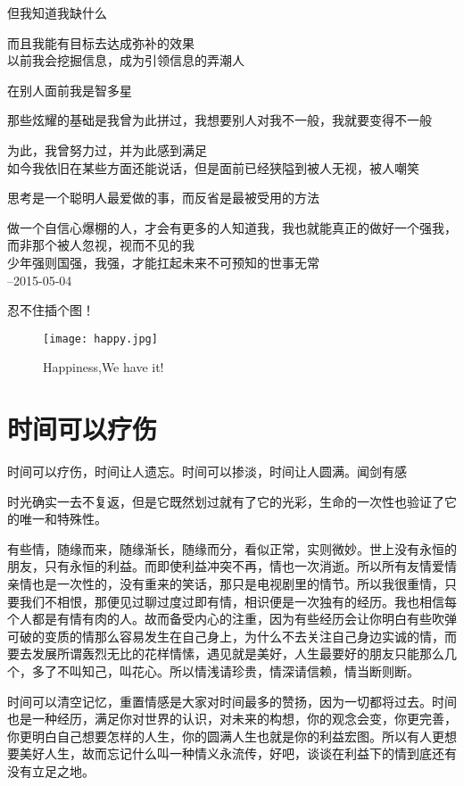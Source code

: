 \documentclass[color=green,mathpazo,titlestyle=hang]{elegantbook}
\begin{document}
但我知道我缺什么

而且我能有目标去达成弥补的效果~\\
 
以前我会挖掘信息，成为引领信息的弄潮人

在别人面前我是智多星

那些炫耀的基础是我曾为此拼过，我想要别人对我不一般，我就要变得不一般

为此，我曾努力过，并为此感到满足~\\
 
如今我依旧在某些方面还能说话，但是面前已经狭隘到被人无视，被人嘲笑

思考是一个聪明人最爱做的事，而反省是最被受用的方法

做一个自信心爆棚的人，才会有更多的人知道我，我也就能真正的做好一个强我，而非那个被人忽视，视而不见的我~\\

少年强则国强，我强，才能扛起未来不可预知的世事无常~\\

--2015-05-04

{\color{thid}忍不住插个图！}

\begin{figure}[!hbtp]
\texttt{[image: happy.jpg]}
\caption{Happiness,We have it!\label{figur:happy}}
\end{figure}

\section{时间可以疗伤}
时间可以疗伤，时间让人遗忘。时间可以掺淡，时间让人圆满。闻剑有感

时光确实一去不复返，但是它既然划过就有了它的光彩，生命的一次性也验证了它的唯一和特殊性。

有些情，随缘而来，随缘渐长，随缘而分，看似正常，实则微妙。世上没有永恒的朋友，只有永恒的利益。而即使利益冲突不再，情也一次消逝。所以所有友情爱情亲情也是一次性的，没有重来的笑话，那只是电视剧里的情节。所以我很重情，只要我们不相恨，那便见过聊过度过即有情，相识便是一次独有的经历。我也相信每个人都是有情有肉的人。故而备受内心的注重，因为有些经历会让你明白有些吹弹可破的变质的情那么容易发生在自己身上，为什么不去关注自己身边实诚的情，而要去发展所谓轰烈无比的花样情愫，遇见就是美好，人生最要好的朋友只能那么几个，多了不叫知己，叫花心。所以情浅请珍贵，情深请信赖，情当断则断。

时间可以清空记忆，重置情感是大家对时间最多的赞扬，因为一切都将过去。时间也是一种经历，满足你对世界的认识，对未来的构想，你的观念会变，你更完善，你更明白自己想要怎样的人生，你的圆满人生也就是你的利益宏图。所以有人更想要美好人生，故而忘记什么叫一种情义永流传，好吧，谈谈在利益下的情到底还有没有立足之地。
\end{document}
